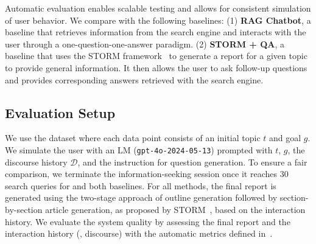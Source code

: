 

Automatic evaluation enables scalable testing and allows for consistent simulation of user behavior. We compare \system with the following baselines: (1) \textbf{RAG Chatbot}, a baseline that retrieves information from the search engine and interacts with the user through a one-question-one-answer paradigm. (2) \textbf{STORM + QA}, a baseline that uses the STORM framework~\citep{shao2024assisting} to generate a report for a given topic to provide general information. It then allows the user to ask follow-up questions and provides corresponding answers retrieved with the search engine.

\subsection{Evaluation Setup}
We use the \data dataset where each data point consists of an initial topic $t$ and goal $g$. 
We simulate the user 
with an LM (\texttt{gpt-4o-2024-05-13}) prompted with $t$, $g$, the discourse history $\mathcal{D}$, and the instruction for question generation. To ensure a fair comparison, we terminate the information-seeking session once it reaches 30 search queries for \system and both baselines. For all methods, the final report is generated using the two-stage approach of outline generation followed by section-by-section article generation, as proposed by STORM~\citep{shao2024assisting}, based on the interaction history. We evaluate the system quality by assessing the final report and the interaction history (\ie, discourse) with the automatic metrics defined in~.


